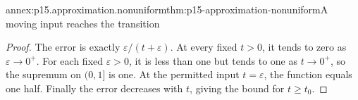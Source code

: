\begin{annexitem}{annex:p15.approximation.nonuniform}{thm:p15-approximation-nonuniform}{A moving input reaches the transition}
\begin{proof}
The error is exactly \(\varepsilon/(t+\varepsilon)\). At every fixed
\(t>0\), it tends to zero as \(\varepsilon\to0^+\). For each fixed
\(\varepsilon>0\), it is less than one but tends to one as \(t\to0^+\),
so the supremum on \((0,1]\) is one. At the permitted input
\(t=\varepsilon\), the function equals one half. Finally the error
decreases with \(t\), giving the bound for \(t\geq t_0\).
\end{proof}
\end{annexitem}
